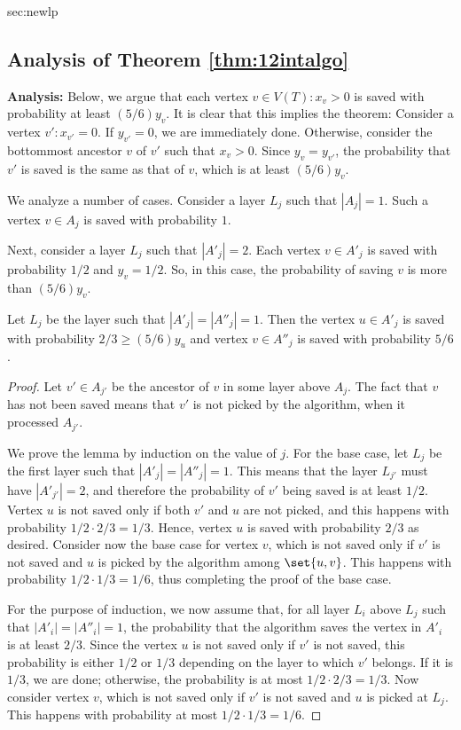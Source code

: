 \begin{appendixextra}{sec:newlp}{\subsection{Analysis of Theorem \ref{thm:12intalgo}}}
\textbf{Analysis: }    
Below, we argue that each vertex $v \in V(T): x_v >0$ is saved with probability at least $(5/6) y_v$. 
It is clear that this implies the theorem: Consider a vertex $v': x_{v'}=0$.
If $y_{v'}=0$, we are immediately done. Otherwise, consider the bottommost ancestor $v$ of $v'$ such that $x_v >0$. 
Since $y_v = y_{v'}$, the probability that $v'$ is saved is the same as that of $v$, which is at least $(5/6) y_v$.    

We analyze a number of cases.
Consider a layer $L_j$ such that $|A_j|=1$. 
Such a vertex $v \in A_j$ is saved with probability $1$. 

Next, consider a layer $L_j$ such that $|A'_j| =2$. 
Each vertex $v \in A'_j$ is saved with probability $1/2$ and $y_v = 1/2$. 
So, in this case, the probability of saving $v$ is more than $(5/6) y_v$.  

\begin{lemma}
\label{one-and-one} 
Let $L_j$ be the layer such that $|A'_j| = |A''_j| =1$. 
Then the vertex $u \in A'_j$ is saved with probability $2/3 \geq (5/6) y_u$ and vertex $v \in A''_j$ is saved with probability $5/6$. 
\end{lemma} 

\begin{proof} 
Let $v' \in A_{j'}$ be the ancestor of $v$ in some layer above $A_j$. 
The fact that $v$ has not been saved means that $v'$ is not picked by the algorithm, when it processed $A_{j'}$. 

We prove the lemma by induction on the value of $j$. 
For the base case, let $L_j$ be the first layer such that $|A'_j| = |A''_j| =1$.
This means that the layer $L_{j'}$ must have $|A'_{j'}| = 2$, and therefore the probability of $v'$ being saved is at least $1/2$. 
Vertex $u$ is not saved only if both $v'$ and $u$ are not picked, and this happens with probability $1/2 \cdot 2/3 = 1/3$.
Hence, vertex $u$ is saved with probability $2/3$ as desired.   
Consider now the base case for vertex $v$, which is not saved only if $v'$ is not saved and $u$ is picked by the algorithm among $\set{u,v}$.
This happens with probability $1/2 \cdot 1/3 = 1/6$, thus completing the proof of the base case.   


 For the purpose of induction, we now assume that, for all layer $L_i$ above $L_j$ such that $|A'_{i}| = |A''_i| =1$, the probability that the algorithm saves the vertex in $A'_i$ is at least $2/3$.
Since the vertex $u$ is not saved only if $v'$ is not saved, this probability is either $1/2$ or $1/3$ depending on the layer to which $v'$ belongs. If it is $1/3$, we are done; otherwise, the probability is at most $1/2 \cdot 2/3 = 1/3$.   
Now consider vertex $v$, which is not saved only if $v'$ is not saved and $u$ is picked at $L_j$. This happens with probability at most $1/2 \cdot 1/3 = 1/6$.  
\end{proof} 



\end{appendixextra}
